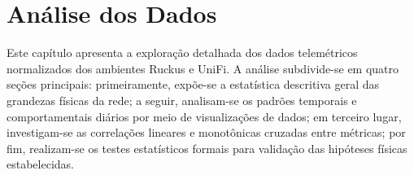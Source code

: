 \chapter{Análise dos Dados}
\label{cap:analise}

Este capítulo apresenta a exploração detalhada dos dados telemétricos normalizados dos ambientes Ruckus e UniFi. A análise subdivide-se em quatro seções principais: primeiramente, expõe-se a estatística descritiva geral das grandezas físicas da rede; a seguir, analisam-se os padrões temporais e comportamentais diários por meio de visualizações de dados; em terceiro lugar, investigam-se as correlações lineares e monotônicas cruzadas entre métricas; por fim, realizam-se os testes estatísticos formais para validação das hipóteses físicas estabelecidas.





